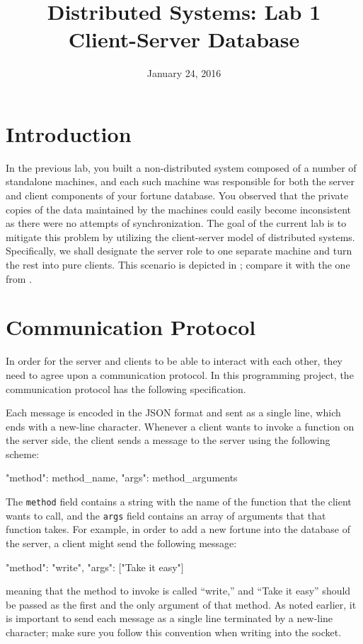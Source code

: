 \documentclass[a4paper]{article}
\title{Distributed Systems: Lab 1\\Client-Server Database}
\author{}
\date{January 24, 2016}
\begin{document}
\maketitle

\section{Introduction}

In the previous lab, you built a non-distributed system composed of a number of
standalone machines, and each such machine was responsible for both the server
and client components of your fortune database. You observed that the private
copies of the data maintained by the machines could easily become inconsistent
as there were no attempts of synchronization. The goal of the current lab is to
mitigate this problem by utilizing the client-server model \cite{lecture2} of
distributed systems. Specifically, we shall designate the server role to one
separate machine and turn the rest into pure clients. This scenario is depicted
in ; compare it with the one from .

\section{Communication Protocol} 
In order for the server and clients to be able to interact with each other, they
need to agree upon a communication protocol. In this programming project, the
communication protocol has the following specification.

Each message is encoded in the JSON format \cite{json, python-json} and sent as
a single line, which ends with a new-line character. Whenever a client wants to
invoke a function on the server side, the client sends a message to the server
using the following scheme:
\begin{json}
{
    "method": method_name,
    "args": method_arguments
}
\end{json}
The \texttt{method} field contains a string with the name of the function that
the client wants to call, and the \texttt{args} field contains an array of
arguments that that function takes. For example, in order to add a new fortune
into the database of the server, a client might send the following message:
\begin{json}
{
    "method": "write",
    "args": ["Take it easy"]
}
\end{json}
meaning that the method to invoke is called ``write,'' and ``Take it easy''
should be passed as the first and the only argument of that method. As noted
earlier, it is important to send each message as a single line terminated by a
new-line character; make sure you follow this convention when writing into the
socket.
\end{document}
